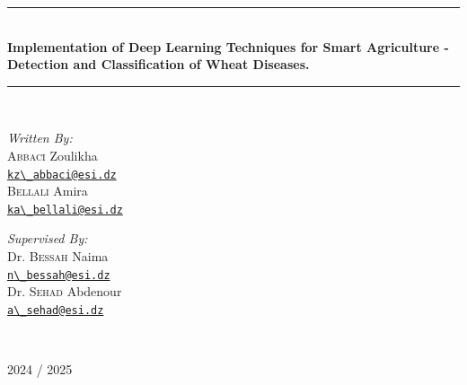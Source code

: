 {\begin{titlepage}
    \rule{\linewidth}{0.3mm} \\[0.4cm]
    {
    \Large \bfseries
    Implementation of Deep Learning Techniques for Smart Agriculture - Detection and Classification of Wheat Diseases.\\
    }
    \rule{\linewidth}{0.3mm} \\[1cm]

    \vspace{10mm}

    \noindent
    \begin{minipage}{0.6\textwidth}
      \vspace{-7mm}
      \begin{flushleft} \large
        \emph{Written By:}\\
        \textsc{Abbaci} Zoulikha \\
        \href{mailto:kz_abbaci@esi.dz}{\verb!kz\_abbaci@esi.dz!} \\[0.3cm]
        \textsc{Bellali} Amira \\
        \href{mailto:ka_bellali@esi.dz}{\verb!ka\_bellali@esi.dz!}
      \end{flushleft}
    \end{minipage}
    \begin{minipage}{0.35\textwidth}
      \begin{flushright} \large
        \begin{flushleft} \large
          \emph{Supervised By:} \\
          Dr. \textsc{Bessah} Naima\\
          \href{mailto:n_bessah@esi.dz}{\verb!n\_bessah@esi.dz!}\\[0.3cm]
          Dr. \textsc{Sehad} Abdenour\\
          \href{mailto:a_sehad@esi.dz}{\verb!a\_sehad@esi.dz!}
        \end{flushleft}
      \end{flushright}
    \end{minipage}\\[1cm]


    \vfill

    {\large 2024 / 2025}
  \end{titlepage}
  \restoregeometry
}
